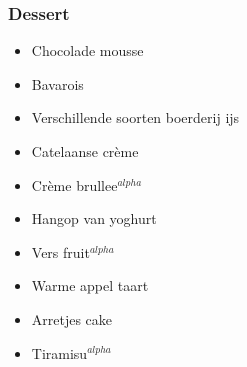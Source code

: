 \subsubsection*{Dessert}
\begin{itemize}
	\item	Chocolade mousse
	\item	Bavarois
	\item	Verschillende soorten boerderij ijs
	\item	Catelaanse crème
	\item	Crème brullee$^{alpha}$
	\item	Hangop van yoghurt
	\item	Vers fruit$^{alpha}$
	\item	Warme appel taart
	\item	Arretjes cake
	\item	Tiramisu$^{alpha}$
\end{itemize}


